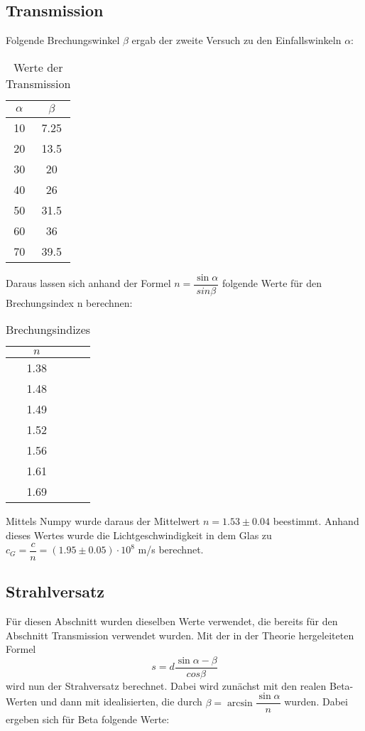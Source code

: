 \subsection{Transmission}
  Folgende Brechungswinkel $\beta$ ergab der zweite Versuch zu den Einfallswinkeln $\alpha$:
  \begin{table}[H]
    \centering
    \caption{Werte der Transmission}
    \begin{tabular}{c c}
      \toprule
      $\alpha$ & $\beta$\\
      \midrule
        10 & 7.25 \\
        20 & 13.5 \\
        30 & 20   \\
        40 & 26   \\
        50 & 31.5 \\
        60 & 36   \\
        70 & 39.5 \\
      \bottomrule
    \end{tabular}
  \end{table}
  \noindent Daraus lassen sich anhand der Formel $n = \dfrac{\sin{\alpha}}{sin{\beta}}$ folgende
  Werte für den Brechungsindex n berechnen:
  \begin{table}[H]
    \centering
    \caption{Brechungsindizes}
    \begin{tabular}{c c}
      \toprule
      $n$\\
      \midrule
      1.38 \\
      1.48 \\
      1.49  \\
      1.52   \\
      1.56 \\
      1.61   \\
      1.69 \\
      \bottomrule
    \end{tabular}
  \end{table}
  \noindent Mittels Numpy wurde daraus der Mittelwert $n=1.53\pm 0.04$ beestimmt. Anhand 
  dieses Wertes wurde die Lichtgeschwindigkeit in dem Glas zu $c_G=\dfrac{c}{n}= (1.95\pm 0.05)
  \cdot 10^{8}$ m/s berechnet.

\subsection{Strahlversatz}
  Für diesen Abschnitt wurden dieselben Werte verwendet, die bereits für den Abschnitt 
  Transmission verwendet wurden.
  Mit der in der Theorie hergeleiteten Formel 
  \begin{equation*}
    s= d\dfrac{\sin{\alpha - \beta}}{cos{\beta}} 
  \end{equation*}
  wird nun der Strahversatz berechnet. Dabei wird zunächst mit den realen Beta-Werten und dann
  mit idealisierten, die durch $\beta=\arcsin{\dfrac{\sin{\alpha}}{n}}$ wurden. Dabei ergeben 
  sich für Beta folgende Werte:

